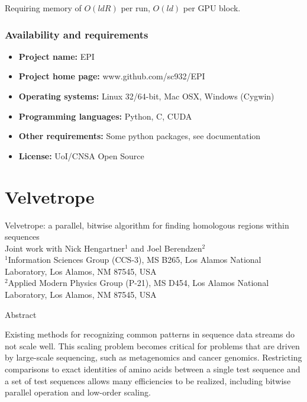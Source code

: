\documentclass[phd,tocprelim]{cornell}
\begin{document}
Requiring memory of $O(ldR)$ per run, $O(ld)$ per GPU block.




\section{Availability and requirements}
 \begin{itemize}
  \item \textbf{Project name:} EPI
  \item \textbf{Project home page:} www.github.com/sc932/EPI
  \item \textbf{Operating systems:} Linux 32/64-bit, Mac OSX, Windows (Cygwin)
  \item \textbf{Programming languages:} Python, C, CUDA
  \item \textbf{Other requirements:} Some python packages, see documentation
  \item \textbf{License:} UoI/CNSA Open Source
 \end{itemize}




\part{Velvetrope} %
\label{prt:Velvetrope}

\noindent
\Large
Velvetrope: a parallel, bitwise algorithm for finding homologous regions within sequences \\
\normalsize
Joint work with Nick Hengartner$^{1}$ and Joel Berendzen$^{2}$ \\
\scriptsize
$^{1}$Information Sciences Group (CCS-3), MS B265, Los Alamos National
 Laboratory, Los Alamos, NM 87545, USA \\
$^{2}$Applied Modern Physics Group (P-21), MS D454, Los Alamos National
 Laboratory, Los Alamos, NM 87545, USA
\normalsize

\begin{center}
   Abstract 
\end{center}

Existing methods for recognizing common patterns in sequence data
streams do not scale well. This scaling problem becomes critical for
problems that are driven by large-scale sequencing, such as
metagenomics and cancer genomics.  Restricting comparisons to exact
identities of amino acids between a single test sequence and a set of
test sequences allows many efficiencies to be realized, including
bitwise parallel operation and low-order scaling.
\end{document}
